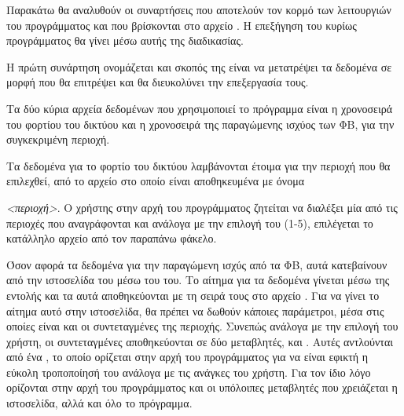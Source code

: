 \documentclass[12pt]{report}
\begin{document}
Παρακάτω θα αναλυθούν οι συναρτήσεις που αποτελούν τον κορμό των λειτουργιών του προγράμματος και που βρίσκονται
στο αρχείο {}. Η επεξήγηση του κυρίως προγράμματος {} θα γίνει μέσω αυτής της διαδικασίας.

Η πρώτη συνάρτηση ονομάζεται {} και σκοπός της είναι να μετατρέψει τα δεδομένα
σε μορφή που θα επιτρέψει και θα διευκολύνει την επεξεργασία τους.

Τα δύο κύρια αρχεία δεδομένων που χρησιμοποιεί το πρόγραμμα είναι η χρονοσειρά του φορτίου του δικτύου και η 
χρονοσειρά της παραγώμενης ισχύος των ΦΒ, για την συγκεκριμένη περιοχή. 

Τα δεδομένα για το φορτίο του δικτύου λαμβάνονται έτοιμα για την περιοχή που θα επιλεχθεί, από το αρχείο στο οποίο
είναι αποθηκευμένα με όνομα {{}\textit{<περιοχή>}{}. 
Ο χρήστης στην αρχή του προγράμματος ζητείται να διαλέξει μία από τις περιοχές που αναγράφονται και ανάλογα με την
επιλογή του (1-5), επιλέγεται το κατάλληλο αρχείο από τον παραπάνω φάκελο.

{}

Όσον αφορά τα δεδομένα για την παραγώμενη ισχύς από τα ΦΒ, αυτά κατεβαίνουν από την ιστοσελίδα του 
{} μέσω του {} του. Το αίτημα για τα δεδομένα γίνεται 
μέσω της εντολής {} και τα αυτά αποθηκεύονται με τη σειρά τους στο αρχείο 
{}.
Για να γίνει το αίτημα αυτό στην ιστοσελίδα, θα πρέπει να δωθούν κάποιες παράμετροι, μέσα στις οποίες είναι και οι 
συντεταγμένες της περιοχής. Συνεπώς ανάλογα με την επιλογή του χρήστη, οι συντεταγμένες αποθηκεύονται σε δύο 
μεταβλητές, {} και {}. Αυτές αντλούνται από ένα {}, το οποίο
ορίζεται στην αρχή του προγράμματος για να είναι εφικτή η εύκολη τροποποίησή του ανάλογα με τις ανάγκες του χρήστη.
Για τον ίδιο λόγο ορίζονται στην αρχή του προγράμματος και οι υπόλοιπες μεταβλητές που χρειάζεται η ιστοσελίδα, 
αλλά και όλο το πρόγραμμα.

}
\end{document}
